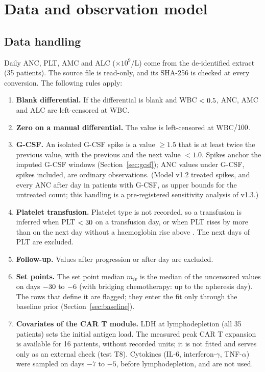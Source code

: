 \documentclass[11pt]{article}
\begin{document}
\section{Data and observation model}\label{sec:obs}

\subsection{Data handling}
Daily ANC, PLT, AMC and ALC ($\times10^9$/L) come from the de-identified extract (35 patients). The source file is read-only, and its SHA-256 is checked at every conversion. The following rules apply:
\begin{enumerate}
\item \textbf{Blank differential.} If the differential is blank and WBC $<0.5$, ANC, AMC and ALC are left-censored at WBC.
\item \textbf{Zero on a manual differential.} The value is left-censored at WBC$/100$.
\item \textbf{G-CSF.} An isolated G-CSF spike is a value $\geq1.5$ that is at least twice the previous value, with the previous and the next value $<1.0$. Spikes anchor the imputed G-CSF windows (Section~\ref{sec:gcsf}); ANC values under G-CSF, spikes included, are ordinary observations. (Model v1.2 treated spikes, and every ANC after day \valGcsfDay{} in patients with G-CSF, as upper bounds for the untreated count; this handling is a pre-registered sensitivity analysis of v1.3.)
\item \textbf{Platelet transfusion.} Platelet type is not recorded, so a transfusion is inferred when PLT $<30$ on a transfusion day, or when PLT rises by more than \valPltRise{} on the next day without a haemoglobin rise above \valHgbRise. The next \valPltDrop{} days of PLT are excluded.
\item \textbf{Follow-up.} Values after progression or after day \valObsMax{} are excluded.
\item \textbf{Set points.} The set point median $m_{iv}$ is the median of the uncensored values on days $-30$ to $-6$ (with bridging chemotherapy: up to the apheresis day). The rows that define it are flagged; they enter the fit only through the baseline prior (Section~\ref{sec:baseline}).
\item \textbf{Covariates of the CAR T module.} LDH at lymphodepletion (all 35 patients) sets the initial antigen load. The measured peak CAR T expansion is available for 16 patients, without recorded units; it is not fitted and serves only as an external check (test T8). Cytokines (IL-6, interferon-$\gamma$, TNF-$\alpha$) were sampled on days $-7$ to $-5$, before lymphodepletion, and are not used.
\end{enumerate}
\end{document}
